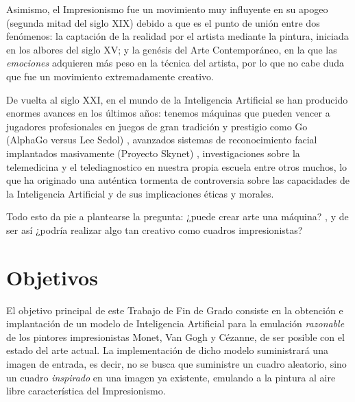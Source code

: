 \documentclass[../main.tex]{subfiles}
\begin{document}
\newpage
Asimismo, el Impresionismo fue un movimiento muy influyente en su apogeo (segunda mitad del siglo XIX) debido a que es el punto de unión entre dos fenómenos: la captación de la realidad por el artista mediante la pintura, iniciada en los albores del siglo XV; y la genésis del Arte Contemporáneo, en la que las \textit{emociones} adquieren más peso en la técnica del artista, por lo que no cabe duda que fue un movimiento extremadamente creativo.
\newline

De vuelta al siglo XXI, en el mundo de la Inteligencia Artificial se han producido enormes avances en los últimos años: tenemos máquinas que pueden vencer a jugadores profesionales en juegos de gran tradición y prestigio como Go (AlphaGo versus Lee Sedol) \cite{Metz2016}, avanzados sistemas de reconocimiento facial implantados masivamente (Proyecto Skynet) \cite{Diez2019}, investigaciones sobre la telemedicina y el telediagnostico en nuestra propia escuela \cite{Aldana2019} entre otros muchos, lo que ha originado una auténtica tormenta de controversia sobre las capacidades de la Inteligencia Artificial y de sus implicaciones éticas y morales.
\newline

Todo esto da pie a plantearse la pregunta: ¿puede crear arte una máquina? \cite{Garcia2017} \cite{Serradilla2017}, y de ser así ¿podría realizar algo tan creativo como cuadros impresionistas?
\section{Objetivos}
El objetivo principal de este Trabajo de Fin de Grado consiste en la obtención e implantación de un modelo de Inteligencia Artificial para la emulación \textit{razonable} de los pintores impresionistas Monet, Van Gogh y Cézanne, de ser posible con el estado del arte actual. La implementación de dicho modelo suministrará una imagen de entrada, es decir, no se busca que suministre un cuadro aleatorio, sino un cuadro \textit{inspirado} en una imagen ya existente, emulando a la pintura al aire libre característica del Impresionismo.
\end{document}
